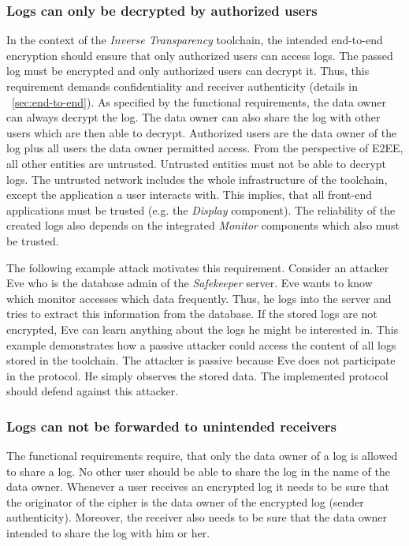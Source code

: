 \documentclass[../main.tex]{subfiles}
\begin{document}
\subsubsection{Logs can only be decrypted by authorized users}
In the context of the \emph{Inverse Transparency} toolchain, the intended end-to-end encryption should ensure that only authorized users can access logs.
The passed log must be encrypted and only authorized users can decrypt it.
Thus, this requirement demands confidentiality and receiver authenticity (details in ~\cref{sec:end-to-end}).
As specified by the functional requirements, the data owner can always decrypt the log.
The data owner can also share the log with other users which are then able to decrypt.
Authorized users are the data owner of the log plus all users the data owner permitted access.
From the perspective of E2EE, all other entities are untrusted.
Untrusted entities must not be able to decrypt logs.
The untrusted network includes the whole infrastructure of the toolchain, except the application a user interacts with.
This implies, that all front-end applications must be trusted (e.g. the \emph{Display} component).
The reliability of the created logs also depends on the integrated \emph{Monitor} components which also must be trusted.

The following example attack motivates this requirement.
Consider an attacker Eve who is the database admin of the \emph{Safekeeper} server.
Eve wants to know which monitor accesses which data frequently.
Thus, he logs into the server and tries to extract this information from the database.
If the stored logs are not encrypted, Eve can learn anything about the logs he might be interested in.
This example demonstrates how a passive attacker could access the content of all logs stored in the toolchain.
The attacker is passive because Eve does not participate in the protocol.
He simply observes the stored data.
The implemented protocol should defend against this attacker.

\subsubsection{Logs can not be forwarded to unintended receivers}

The functional requirements require, that only the data owner of a log is allowed to share a log.
No other user should be able to share the log in the name of the data owner.
Whenever a user receives an encrypted log it needs to be sure that the originator of the cipher is the data owner of the encrypted log (sender authenticity).
Moreover, the receiver also needs to be sure that the data owner intended to share the log with him or her.
\end{document}
